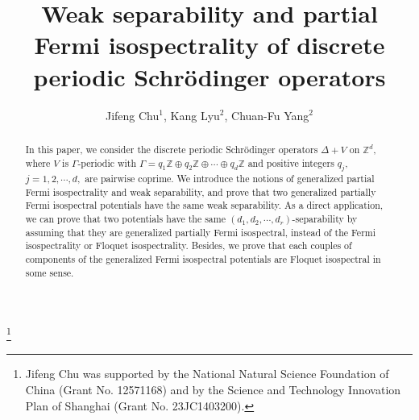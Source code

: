 \documentclass[12pt,letterpaper]{amsart}
\def\Z{{\mathbb Z}}
\begin{document}
\title[]{Weak separability and partial Fermi isospectrality of discrete periodic Schr\"odinger operators}
\author[]
{Jifeng Chu$^{1}$, \quad Kang Lyu$^2$, \quad Chuan-Fu Yang$^2$}

\address{$^1$ School of Mathematics, Hangzhou Normal University, Hangzhou 311121, China}
\address{$^2$ School of Mathematics and Statistics, Nanjing University of Science and Technology, Nanjing 210094, China}
\thanks{Jifeng Chu was supported by the National Natural Science Foundation of China (Grant
No. 12571168) and by the Science and Technology Innovation Plan of Shanghai (Grant No. 23JC1403200).}



\begin{abstract}
In this paper, we consider the discrete periodic Schr\"odinger operators $\Delta+V$ on $\Z^d$, where
$V$ is  $\Gamma$-periodic with $\Gamma=q_1 \mathbb{Z}\oplus q_2\mathbb{Z}\oplus\cdots\oplus q_d\mathbb{Z}$ and
positive integers $q_j$, $j=1,2,\cdots,d,$ are pairwise coprime.
{We introduce the notions of generalized partial Fermi isospectrality and weak separability, and prove that two {generalized} partially Fermi isospectral potentials have the same weak separability. As a direct application, we can prove that two potentials have the same $(d_1,d_2,\cdots,d_r)$-separability by assuming that they are generalized partially Fermi isospectral,
	  instead of the  Fermi isospectrality or Floquet isospectrality. Besides, we prove that each couples of components of the generalized Fermi isospectral potentials are Floquet isospectral in some sense.}
\end{abstract}

\maketitle
\end{document}
